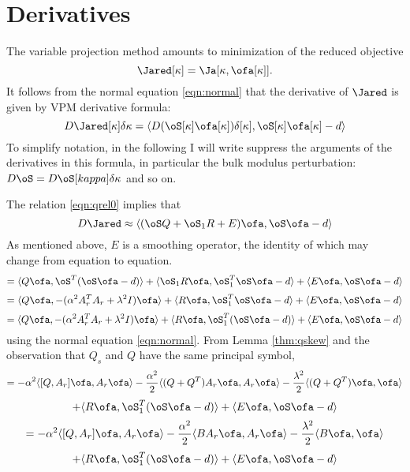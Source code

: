 \section{Derivatives}
The variable projection method amounts to minimization of the reduced objective
\[
\Jared[\kappa] = \Ja[\kappa,\ofa[\kappa]].
\]
It follows from the normal equation \ref{eqn:normal} that the derivative of $\Jared$ is given by
VPM derivative formula:
\[
D\Jared[\kappa]\delta \kappa = \langle D(\oS[\kappa] \ofa[\kappa])\delta[\kappa],\oS[\kappa] \ofa[\kappa] -d\rangle
\]
To simplify notation, in the following I will write suppress the arguments of the derivatives in this formula, in particular the bulk modulus perturbation: $D\oS = D\oS[kappa]\delta \kappa$ and so on. 

The relation \ref{eqn:qrel0} implies that
\[
D\Jared \approx \langle (\oS Q + \oS_1 R + E) \ofa,\oS\ofa -d\rangle
\]
As mentioned above, $E$ is a smoothing operator, the identity of which may change from equation to equation.
\[
= \langle Q\ofa,\oS^T(\oS\ofa -d)\rangle
+ \langle \oS_1R \ofa, \oS_1^T\oS\ofa-d \rangle
+\langle E\ofa,\oS\ofa-d\rangle
\]
\[
 = \langle Q \ofa, -(\alpha^2 A_r^TA_r + \lambda^2I)\ofa \rangle 
+ \langle R\ofa,   \oS_1^T\oS\ofa -d \rangle 
+\langle E\ofa,\oS\ofa-d\rangle
\]
\[
 = \langle Q \ofa, -(\alpha^2 A_r^TA_r + \lambda^2I)\ofa \rangle 
+ \langle R\ofa,   \oS_1^T(\oS\ofa -d) \rangle 
+\langle E\ofa,\oS\ofa-d\rangle
\]
using the normal equation \ref{eqn:normal}. From Lemma \ref{thm:qskew} and the observation that $Q_s$ and $Q$ have the same principal symbol,
\[
 = -\alpha^2\langle [Q,A_r] \ofa, A_r\ofa \rangle -\frac{\alpha^2}{2} \langle (Q+Q^T)A_r\ofa,A_r \ofa \rangle - \frac{\lambda^2}{2} \langle (Q + Q^T)\ofa,\ofa \rangle 
\]
\[
+ \langle R\ofa,   \oS_1^T(\oS\ofa -d) \rangle 
+\langle E\ofa,\oS\ofa-d\rangle 
\]
\[
 = -\alpha^2\langle [Q,A_r] \ofa, A_r\ofa \rangle -\frac{\alpha^2}{2} \langle BA_r\ofa,A_r \ofa \rangle - \frac{\lambda^2}{2} \langle B\ofa,\ofa \rangle 
\]
\begin{equation}
\label{eqn:vpderiv}
+ \langle R\ofa,   \oS_1^T(\oS\ofa -d) \rangle 
+\langle E\ofa,\oS\ofa-d\rangle 
\end{equation}

